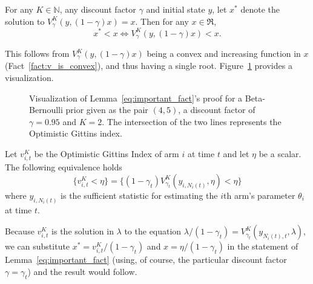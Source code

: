 \begin{lemma} \label{eq:important_fact}
	For any $K \in \mathbb{N}$, any discount factor $\gamma$ and initial state $y$, let $x^*$ denote the solution to $V_\gamma^K(y, (1-\gamma)x) = x$. Then for any $x \in \Re$,
	\begin{equation} \label{eq:equivlance_lambda1}
	x^* < x  \Longleftrightarrow V_\gamma^K(y, (1-\gamma)x) < x.
	\end{equation}
\end{lemma}
\begin{myproof}[Proof.]
	This follows from $V_\gamma^K(y, (1-\gamma)x)$ being a convex and increasing function in $x$ (Fact~\ref{fact:v_is_convex}), and thus having a single root. Figure~\ref{fig:visaulize_gx_proof} provides a visualization.
	\begin{figure}
		\centering
		
		\caption{Visualization of Lemma~\ref{eq:important_fact}'s proof for a Beta-Bernoulli prior given as the pair $(4,5)$, a discount factor of $\gamma=0.95$ and $K = 2$. The intersection of the two lines represents the Optimistic Gittins index.}
		\label{fig:visaulize_gx_proof}
	\end{figure}
\end{myproof}
\begin{corollary} \label{cor:equivalent_event}
	Let $v^K_{i,t}$ be the Optimistic Gittins Index of arm $i$ at time $t$ and let $\eta$ be a scalar. The following equivalence holds
	\[
	\{v^K_{i,t} < \eta \} = \{(1-\gamma_t)V^K_{\gamma_t}(y_{i,N_i(t)}, \eta) < \eta\}\]
	where $y_{i,N_i(t)}$ is the sufficient statistic for estimating the $i$th arm's parameter $\theta_i$ at time $t$.
\end{corollary}
\begin{myproof}[Proof.]
	Because $v^K_{i,t}$ is the solution in $\lambda$ to the equation $\lambda/(1-\gamma_t) = V^K_{\gamma_t}(y_{N_i(t),t}, \lambda)$, we can substitute $x^* = v^K_{i,t}/(1-\gamma_t)$ and $x = \eta/(1-\gamma_t)$ in the statement of Lemma~\eqref{eq:important_fact} (using, of course, the particular discount factor $\gamma = \gamma_t$) and the result would follow.
\end{myproof}


